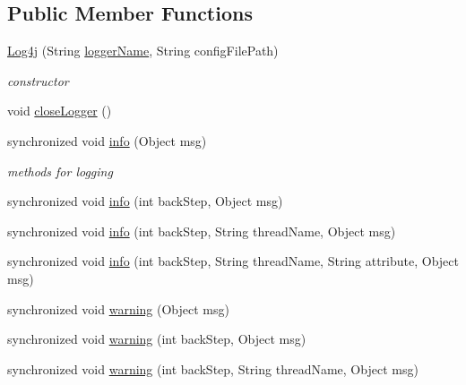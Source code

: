 \subsection*{Public Member Functions}
\begin{DoxyCompactItemize}
\item 
\hyperlink{classit_1_1emarolab_1_1cagg_1_1debugging_1_1DebuggingText_1_1Log4j_a653d83d8632b4046f60606a7deade377}{Log4j} (String \hyperlink{classit_1_1emarolab_1_1cagg_1_1debugging_1_1DebuggingText_afa1175bdb0c7a658affe0b25a8a924c3}{logger\-Name}, String config\-File\-Path)
\begin{DoxyCompactList}\small\item\em constructor \end{DoxyCompactList}\item 
void \hyperlink{classit_1_1emarolab_1_1cagg_1_1debugging_1_1DebuggingText_1_1Log4j_aec2e864507cf6821fe7a7eab1147afea}{close\-Logger} ()
\item 
synchronized void \hyperlink{classit_1_1emarolab_1_1cagg_1_1debugging_1_1DebuggingText_1_1Log4j_af2d111ccf466bc1c1b372608af3a6099}{info} (Object msg)
\begin{DoxyCompactList}\small\item\em methods for logging \end{DoxyCompactList}\item 
synchronized void \hyperlink{classit_1_1emarolab_1_1cagg_1_1debugging_1_1DebuggingText_1_1Log4j_a365589b8340b27690fee9fe219878c08}{info} (int back\-Step, Object msg)
\item 
synchronized void \hyperlink{classit_1_1emarolab_1_1cagg_1_1debugging_1_1DebuggingText_1_1Log4j_a3899be07371e286eb0c7a0c24f92c369}{info} (int back\-Step, String thread\-Name, Object msg)
\item 
synchronized void \hyperlink{classit_1_1emarolab_1_1cagg_1_1debugging_1_1DebuggingText_1_1Log4j_aef96c10e20f64125a98b0901cdc024f5}{info} (int back\-Step, String thread\-Name, String attribute, Object msg)
\item 
synchronized void \hyperlink{classit_1_1emarolab_1_1cagg_1_1debugging_1_1DebuggingText_1_1Log4j_a420095af16b6d3627e24d395b8ff43d5}{warning} (Object msg)
\item 
synchronized void \hyperlink{classit_1_1emarolab_1_1cagg_1_1debugging_1_1DebuggingText_1_1Log4j_a1f18039f3014b2a509f00a8c1661adeb}{warning} (int back\-Step, Object msg)
\item 
synchronized void \hyperlink{classit_1_1emarolab_1_1cagg_1_1debugging_1_1DebuggingText_1_1Log4j_aa2d010128be88721d020bf56875f0dbf}{warning} (int back\-Step, String thread\-Name, Object msg)

\end{DoxyCompactItemize}
